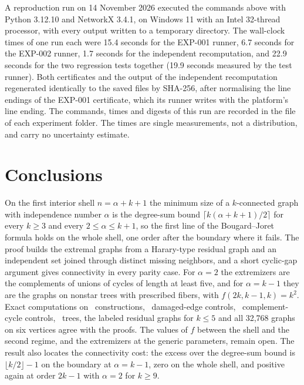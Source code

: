 A reproduction run on 14 November 2026 executed the commands above with Python 3.12.10 and NetworkX 3.4.1, on Windows 11 with an Intel 32-thread processor, with every output written to a temporary directory.
The wall-clock times of one run each were 15.4 seconds for the EXP-001 runner, 6.7 seconds for the EXP-002 runner, 1.7 seconds for the independent recomputation, and 22.9 seconds for the two regression tests together (19.9 seconds measured by the test runner).
Both certificates and the output of the independent recomputation regenerated identically to the saved files by SHA-256, after normalising the line endings of the EXP-001 certificate, which its runner writes with the platform's line ending.
The commands, times and digests of this run are recorded in the file  of each experiment folder.
The times are single measurements, not a distribution, and carry no uncertainty estimate.

\section{Conclusions}\label{sec:conclusions}

On the first interior shell $n=\alpha+k+1$ the minimum size of a $k$-connected graph with independence number $\alpha$ is the degree-sum bound $\lceil k(\alpha+k+1)/2\rceil$ for every $k\ge3$ and every $2\le\alpha\le k+1$, so the first line of the Bougard--Joret formula holds on the whole shell, one order after the boundary where it fails.
The proof builds the extremal graphs from a Harary-type residual graph and an independent set joined through distinct missing neighbors, and a short cyclic-gap argument gives connectivity in every parity case.
For $\alpha=2$ the extremizers are the complements of unions of cycles of length at least five, and for $\alpha=k-1$ they are the graphs on nonstar trees with prescribed fibers, with $f(2k,k-1,k)=k^2$.
Exact computations on \NGraphs\ constructions, \NDamaged\ damaged-edge controls, \NCycleControls\ complement-cycle controls, \NTrees\ trees, the labeled residual graphs for $k\le5$ and all 32,768 graphs on six vertices agree with the proofs.
The values of $f$ between the shell and the second regime, and the extremizers at the generic parameters, remain open.
The result also locates the connectivity cost: the excess over the degree-sum bound is $\lfloor k/2\rfloor-1$ on the boundary at $\alpha=k-1$, zero on the whole shell, and positive again at order $2k-1$ with $\alpha=2$ for $k\ge9$.
